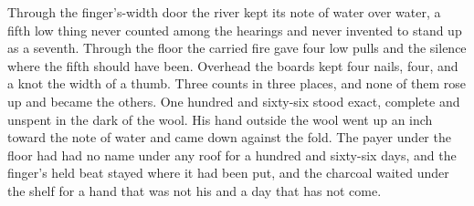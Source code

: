 Through the finger's-width door the river kept its note of water over water, a fifth low thing never counted among the hearings and never invented to stand up as a seventh. Through the floor the carried fire gave four low pulls and the silence where the fifth should have been. Overhead the boards kept four nails, four, and a knot the width of a thumb. Three counts in three places, and none of them rose up and became the others. One hundred and sixty-six stood exact, complete and unspent in the dark of the wool. His hand outside the wool went up an inch toward the note of water and came down against the fold. The payer under the floor had had no name under any roof for a hundred and sixty-six days, and the finger's held beat stayed where it had been put, and the charcoal waited under the shelf for a hand that was not his and a day that has not come.
